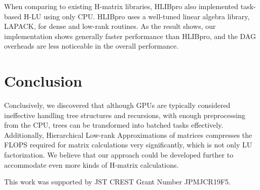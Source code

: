 \documentclass[sigconf]{acmart}
\begin{document}
When comparing to existing H-matrix libraries, HLIBpro\cite{Kriemann13} also implemented task-based H-LU using only CPU. HLIBpro uses a well-tuned linear algebra library, LAPACK, for dense and low-rank routines. As the result shows, our implementation shows generally faster performance than HLIBpro, and the DAG overheads are less noticeable in the overall performance.

\section{Conclusion}
Conclusively, we discovered that although GPUs are typically considered ineffective handling tree structures and recursions, with enough preprocessing from the CPU, trees can be transformed into batched tasks effectively. Additionally, Hierarchical Low-rank Approximations of matrices compresses the FLOPS required for matrix calculations very significantly, which is not only LU factorization. We believe that our approach could be developed further to accommodate even more kinds of H-matrix calculations.

\begin{acks}
This work was supported by JST CREST Grant Number JPMJCR19F5.
\end{acks}



\end{document}
